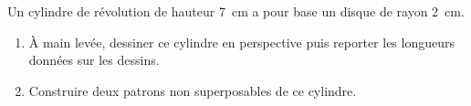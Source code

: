 
\begin{exercice}\label{exo2smath-0300}

    Un cylindre de révolution de hauteur \SI{7}{\centi\meter} a pour base un disque de rayon \SI{2}{\centi\meter}.
\begin{enumerate}
    \item
   À main levée, dessiner ce cylindre en perspective puis reporter les longueurs données sur les dessins.
\item
 Construire deux patrons non superposables de ce cylindre.
\end{enumerate}

\end{exercice}
